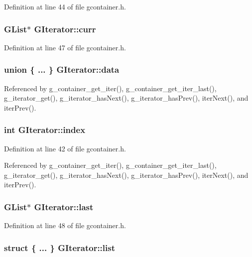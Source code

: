 Definition at line 44 of file gcontainer.h.
\subsubsection{\setlength{\rightskip}{0pt plus 5cm}GList$\ast$ {\bf GIterator::curr}}\label{structGIterator_o4}




Definition at line 47 of file gcontainer.h.
\subsubsection{\setlength{\rightskip}{0pt plus 5cm}union \{ ... \}   {\bf GIterator::data}}\label{structGIterator_o7}




Referenced by g\_\-container\_\-get\_\-iter(), g\_\-container\_\-get\_\-iter\_\-last(), g\_\-iterator\_\-get(), g\_\-iterator\_\-has\-Next(), g\_\-iterator\_\-has\-Prev(), iter\-Next(), and iter\-Prev().
\subsubsection{\setlength{\rightskip}{0pt plus 5cm}int {\bf GIterator::index}}\label{structGIterator_o1}




Definition at line 42 of file gcontainer.h.

Referenced by g\_\-container\_\-get\_\-iter(), g\_\-container\_\-get\_\-iter\_\-last(), g\_\-iterator\_\-get(), g\_\-iterator\_\-has\-Next(), g\_\-iterator\_\-has\-Prev(), iter\-Next(), and iter\-Prev().
\subsubsection{\setlength{\rightskip}{0pt plus 5cm}GList$\ast$ {\bf GIterator::last}}\label{structGIterator_o5}




Definition at line 48 of file gcontainer.h.
\subsubsection{\setlength{\rightskip}{0pt plus 5cm}struct \{ ... \}   {\bf GIterator::list}}\label{structGIterator_o6}


